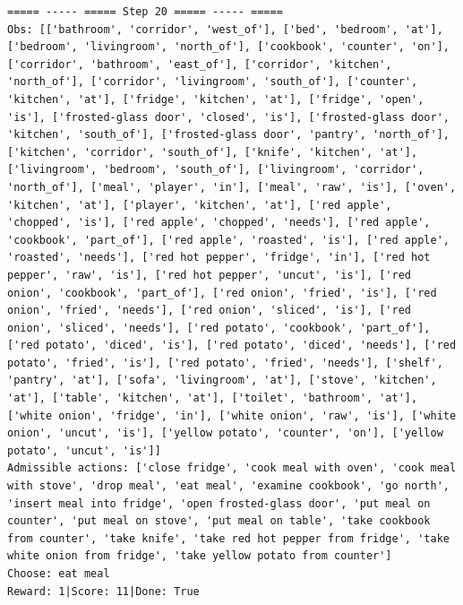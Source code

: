\documentclass[11pt]{article}
\begin{document}
\begin{lstlisting}
===== ----- ===== Step 20 ===== ----- =====
Obs: [['bathroom', 'corridor', 'west_of'], ['bed', 'bedroom', 'at'], ['bedroom', 'livingroom', 'north_of'], ['cookbook', 'counter', 'on'], ['corridor', 'bathroom', 'east_of'], ['corridor', 'kitchen', 'north_of'], ['corridor', 'livingroom', 'south_of'], ['counter', 'kitchen', 'at'], ['fridge', 'kitchen', 'at'], ['fridge', 'open', 'is'], ['frosted-glass door', 'closed', 'is'], ['frosted-glass door', 'kitchen', 'south_of'], ['frosted-glass door', 'pantry', 'north_of'], ['kitchen', 'corridor', 'south_of'], ['knife', 'kitchen', 'at'], ['livingroom', 'bedroom', 'south_of'], ['livingroom', 'corridor', 'north_of'], ['meal', 'player', 'in'], ['meal', 'raw', 'is'], ['oven', 'kitchen', 'at'], ['player', 'kitchen', 'at'], ['red apple', 'chopped', 'is'], ['red apple', 'chopped', 'needs'], ['red apple', 'cookbook', 'part_of'], ['red apple', 'roasted', 'is'], ['red apple', 'roasted', 'needs'], ['red hot pepper', 'fridge', 'in'], ['red hot pepper', 'raw', 'is'], ['red hot pepper', 'uncut', 'is'], ['red onion', 'cookbook', 'part_of'], ['red onion', 'fried', 'is'], ['red onion', 'fried', 'needs'], ['red onion', 'sliced', 'is'], ['red onion', 'sliced', 'needs'], ['red potato', 'cookbook', 'part_of'], ['red potato', 'diced', 'is'], ['red potato', 'diced', 'needs'], ['red potato', 'fried', 'is'], ['red potato', 'fried', 'needs'], ['shelf', 'pantry', 'at'], ['sofa', 'livingroom', 'at'], ['stove', 'kitchen', 'at'], ['table', 'kitchen', 'at'], ['toilet', 'bathroom', 'at'], ['white onion', 'fridge', 'in'], ['white onion', 'raw', 'is'], ['white onion', 'uncut', 'is'], ['yellow potato', 'counter', 'on'], ['yellow potato', 'uncut', 'is']]
Admissible actions: ['close fridge', 'cook meal with oven', 'cook meal with stove', 'drop meal', 'eat meal', 'examine cookbook', 'go north', 'insert meal into fridge', 'open frosted-glass door', 'put meal on counter', 'put meal on stove', 'put meal on table', 'take cookbook from counter', 'take knife', 'take red hot pepper from fridge', 'take white onion from fridge', 'take yellow potato from counter']
Choose: eat meal
Reward: 1|Score: 11|Done: True


\end{lstlisting}
\end{document}
